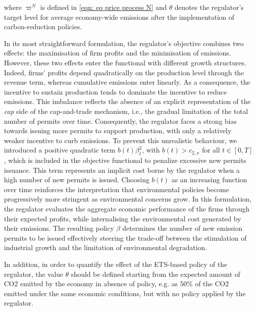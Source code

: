 \documentclass[11pt,twoside]{amsart}
\theoremstyle{definition}
\numberwithin{equation}{section}
\newcommand{\w}{\varpi}
\begin{document}
where $\w^N$ is defined in \eqref{eqn: eq price process N} and $\theta$ denotes the regulator’s target level for average economy-wide emissions after the implementation of carbon-reduction policies.

In its most straightforward formulation, the regulator’s objective combines two effects: the maximisation of firm profits and the minimisation of emissions. However, these two effects enter the functional with different growth structures. Indeed, firms’ profits depend quadratically on the production level through the revenue term, whereas cumulative emissions enter linearly. As a consequence, the incentive to sustain production tends to dominate the incentive to reduce emissions. This imbalance reflects the absence of an explicit representation of the \emph{cap} side of the cap-and-trade mechanism, i.e., the gradual limitation of the total number of permits over time. Consequently, the regulator faces a strong bias towards issuing more permits to support production, with only a relatively weaker incentive to curb emissions.
To prevent this unrealistic behaviour, we introduced a positive quadratic term $b(t)\beta_t^2$, with  $b(t) > c_{2,x}$ for all $t\in[0,T]$, which is included in the objective functional to penalize excessive new permits issuance. This term represents an implicit cost borne by the regulator when a high number of new permits is issued. Choosing $b(t)$ as an increasing function over time reinforces the interpretation that environmental policies become progressively more stringent as environmental concerns grow. In this formulation, the regulator evaluates the aggregate economic performance of the firms through their expected profits, while internalising the environmental cost generated by their emissions. The resulting policy $\beta$ determines the number of new emission permits to be issued effectively steering the trade-off between the stimulation of industrial growth and the limitation of environmental degradation.

In addition, in order to quantify the effect of the ETS-based policy of the regulator, the value $\theta$ should be defined starting from the expected amount of CO2 emitted by the economy in absence of policy, e.g. as $50\%$ of the CO2 emitted under the same economic conditions, but with no policy applied by the regulator.
\end{document}
